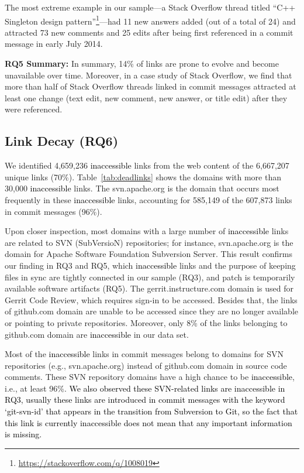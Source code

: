 \documentclass[smallextended]{svjour3}       %
\newcommand{\fix}[1]{\textcolor{black}{#1}}
\newcommand{\minor}[1]{\textcolor{black}{#1}}
\begin{document}
The most extreme example in our sample---a Stack Overflow thread titled ``C++ Singleton design pattern''\footnote{\url{https://stackoverflow.com/q/1008019}}---had 11 new answers added (out of a total of 24) and attracted 73 new comments and 25 edits after being first referenced in a commit message in early July 2014.




\begin{tcolorbox}
\textbf{RQ5 Summary:}
In summary, 14\% of links are prone to evolve and become unavailable over time.
Moreover, in a case study of Stack Overflow, we find that more than half of Stack Overflow threads linked in commit messages attracted at least one change (text edit, new comment, new answer, or title edit) after they were referenced.
\end{tcolorbox}






\subsection{Link Decay (RQ6)}
We identified 4,659,236 \minor{inaccessible} links from the \fix{w}eb content of the 6,667,207 unique links (70\%).
Table~\ref{tab:deadlinks} shows the domains with more than 30,000 \minor{inaccessible} links. The \textsf{svn.apache.org} is the domain that occurs most frequently in these \minor{inaccessible} links, accounting for 585,149 of the 607,873 links in commit messages (96\%). 

Upon closer inspection, most domains with a large number of \minor{inaccessible} links are related to SVN (SubVersioN) repositories; for instance, \textsf{svn.apache.org} is the domain for Apache Software Foundation Subversion Server. This result confirms our finding in RQ3 and RQ5, which \minor{inaccessible} links and the purpose of keeping files in sync are tightly connected in our sample (RQ3), and patch is temporarily available software artifacts (RQ5). The \textsf{gerrit.instructure.com} domain is used for Gerrit Code Review, which requires sign-in to be accessed. Besides that, the links of \textsf{github.com} domain are unable to be accessed since they are no longer
available or pointing to private repositories. Moreover, only 8\% of the links belonging to \textsf{github.com} domain are \minor{inaccessible} in our data set.

Most of the \minor{inaccessible} links in commit messages belong to domains for SVN repositories (e.g., \textsf{svn.apache.org}) instead of \textsf{github.com} domain in source code comments. These SVN repository domains have a high chance to be \minor{inaccessible}, i.e., at least 96\%. \fix{We also observed these SVN-related links are \minor{inaccessible} in RQ3, usually these links are introduced in commit messages with the keyword `git-svn-id' that appears in the
transition from Subversion to Git, so the fact that this link is currently inaccessible does not mean
that any important information is missing.}
\end{document}
